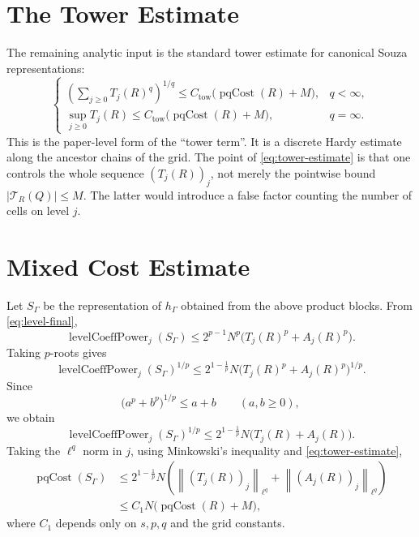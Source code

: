 \documentclass[11pt]{article}
\newcommand{\Tcal}{\mathcal T}
\newcommand{\1}{\mathbf 1}
\newcommand{\abs}[1]{\left|#1\right|}
\newcommand{\norm}[1]{\left\|#1\right\|}
\begin{document}
\section*{The Tower Estimate}

The remaining analytic input is the standard tower estimate for canonical
Souza representations:
\begin{equation}\label{eq:tower-estimate}
  \begin{cases}
  \displaystyle
  \left(
    \sum_{j\ge0} T_j(R)^q
  \right)^{1/q}
  \le
  C_{\mathrm{tow}}
  \bigl(\operatorname{pqCost}(R)+M\bigr),
  & q<\infty,\\[2ex]
  \displaystyle
  \sup_{j\ge0}T_j(R)
  \le
  C_{\mathrm{tow}}
  \bigl(\operatorname{pqCost}(R)+M\bigr),
  & q=\infty.
  \end{cases}
\end{equation}
This is the paper-level form of the ``tower term''.  It is a discrete Hardy
estimate along the ancestor chains of the grid.  The point of
\eqref{eq:tower-estimate} is that one controls the whole sequence
\((T_j(R))_j\), not merely the pointwise bound
\(\abs{\Tcal_R(Q)}\le M\).  The latter would introduce a false factor counting
the number of cells on level \(j\).

\section*{Mixed Cost Estimate}

Let \(S_\Gamma\) be the representation of \(h_\Gamma\) obtained from the above
product blocks.  From \eqref{eq:level-final},
\[
  \operatorname{levelCoeffPower}_j(S_\Gamma)
  \le
  2^{p-1}N^p
  \bigl(T_j(R)^p+A_j(R)^p\bigr).
\]
Taking \(p\)-roots gives
\[
  \operatorname{levelCoeffPower}_j(S_\Gamma)^{1/p}
  \le
  2^{1-\frac1p}N
  \bigl(T_j(R)^p+A_j(R)^p\bigr)^{1/p}.
\]
Since
\[
  \bigl(a^p+b^p\bigr)^{1/p}\le a+b
  \qquad (a,b\ge0),
\]
we obtain
\[
  \operatorname{levelCoeffPower}_j(S_\Gamma)^{1/p}
  \le
  2^{1-\frac1p}N
  \bigl(T_j(R)+A_j(R)\bigr).
\]
Taking the \(\ell^q\) norm in \(j\), using Minkowski's inequality and
\eqref{eq:tower-estimate},
\begin{align}
  \operatorname{pqCost}(S_\Gamma)
  &\le
  2^{1-\frac1p}N
  \left(
    \norm{(T_j(R))_j}_{\ell^q}
    +
    \norm{(A_j(R))_j}_{\ell^q}
  \right)
  \nonumber\\
  &\le
  C_1 N
  \bigl(\operatorname{pqCost}(R)+M\bigr),
  \label{eq:finite-cost}
\end{align}
where \(C_1\) depends only on \(s,p,q\) and the grid constants.
\end{document}
